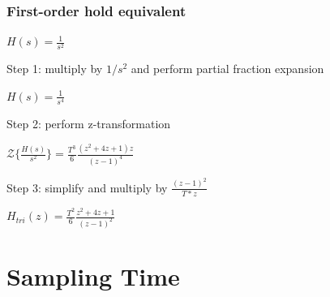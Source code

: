 \begin{frame}
	\frametitle{First-order hold equivalent}
	\begin{example}
		\begin{center}
			$H(s) = \frac{1}{s^{2}}$
		\end{center}
		Step 1: multiply by $1/s^{2}$ and perform partial fraction expansion
		\begin{center}
			$H(s) = \frac{1}{s^{4}}$
		\end{center}
		Step 2: perform z-transformation
		\begin{center}
			$\mathcal{Z}\{\frac{H(s)}{s^{2}}\} = \frac{T^{3}}{6} \frac{(z^{2} + 4z +1) z}{(z-1)^{4}}$
		\end{center}
		Step 3: simplify and multiply by $\frac{(z-1)^{2}}{T*z}$
		\begin{center}
			$H_{tri}(z) = \frac{T^{2}}{6} \frac{z^{2} + 4z + 1}{(z-1)^{2}}$
		\end{center}
	\end{example}
\end{frame}

\section{Sampling Time}

